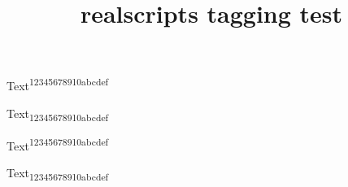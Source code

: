 \documentclass{article}
\title{realscripts tagging test}
\begin{document}
Text\textsuperscript{12345678910abcdef}

Text\textsubscript{12345678910abcdef}

Text\textsuperscript*{12345678910abcdef}

Text\textsubscript*{12345678910abcdef}
\end{document}
